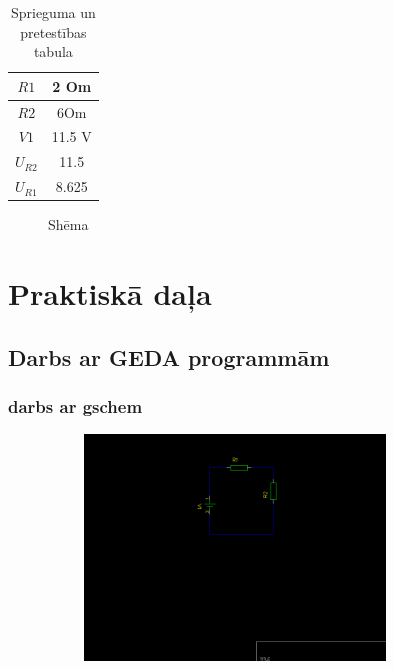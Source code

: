 \documentclass{report}
\begin{document}
\begin {table}[h]
\begin{tabular}{c|c}
\hline
     $R1$ & 2 Om \\
     \hline
     $R2$ & 6Om \\
     \hline
     $V1$ & 11.5 V \\
     \hline
     $U_{R2}$ & 11.5 \\
     \hline
     $U_{R1}$ & 8.625 \\
     \hline
     
\end{tabular}
\caption {Sprieguma un pretestības tabula}
\end {table}
\begin{figure}[h]
    \centering
    \caption{Shēma}
    \label{fig:my_label1}
\end{figure}

\chapter{Praktiskā daļa}
\section{Darbs ar GEDA programmām}
\subsection{darbs ar gschem}
        \includegraphics[width=12cm, height=6cm]{01.png}
\end{document}
